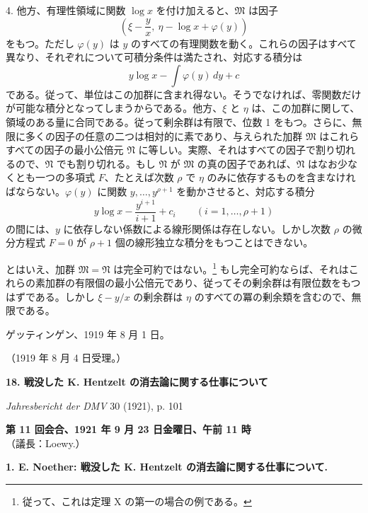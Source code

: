 4. 他方、有理性領域に関数 $\log x$ を付け加えると、$\mathfrak M$ は因子
\[
 \left(\xi-\frac{y}{x},\ \eta-\log x+\varphi(y)\right)
\]
をもつ。ただし $\varphi(y)$ は $y$ のすべての有理関数を動く。これらの因子はすべて異なり、それぞれについて可積分条件は満たされ、対応する積分は
\[
 y\log x-\int\varphi(y)\,dy+c
\]
である。従って、単位はこの加群に含まれ得ない。そうでなければ、零関数だけが可能な積分となってしまうからである。他方、$\xi$ と $\eta$ は、この加群に関して、領域のある量に合同である。従って剰余群は有限で、位数 1 をもつ。さらに、無限に多くの因子の任意の二つは相対的に素であり、与えられた加群 $\mathfrak M$ はこれらすべての因子の最小公倍元 $\mathfrak N$ に等しい。実際、それはすべての因子で割り切れるので、$\mathfrak N$ でも割り切れる。もし $\mathfrak N$ が $\mathfrak M$ の真の因子であれば、$\mathfrak N$ はなお少なくとも一つの多項式 $F$、たとえば次数 $\rho$ で $\eta$ のみに依存するものを含まなければならない。$\varphi(y)$ に関数 $y,\ldots,y^{\rho+1}$ を動かさせると、対応する積分
\[
 y\log x-\frac{y^{i+1}}{i+1}+c_i
 \qquad(i=1,
\ldots,
\rho+1)
\]
の間には、$y$ に依存しない係数による線形関係は存在しない。しかし次数 $\rho$ の微分方程式 $F=0$ が $\rho+1$ 個の線形独立な積分をもつことはできない。

とはいえ、加群 $\mathfrak M=\mathfrak N$ は完全可約ではない。\footnote{従って、これは定理 X の第一の場合の例である。} もし完全可約ならば、それはこれらの素加群の有限個の最小公倍元であり、従ってその剰余群は有限位数をもつはずである。しかし $\xi-y/x$ の剰余群は $\eta$ のすべての冪の剰余類を含むので、無限である。

ゲッティンゲン、1919 年 8 月 1 日。

\begin{center}
（1919 年 8 月 4 日受理。）
\end{center}

\clearpage
\setcounter{footnote}{0}
\begin{center}
{\Large\bfseries 18. 戦没した K. Hentzelt の消去論に関する仕事について}\par
\vspace{1em}
\emph{Jahresbericht der DMV} 30 (1921), p. 101
\end{center}

\begin{center}
\textbf{第 11 回会合、1921 年 9 月 23 日金曜日、午前 11 時}\\
（議長：Loewy.）
\end{center}

\textbf{1. E. Noether: 戦没した K. Hentzelt の消去論に関する仕事について.}

